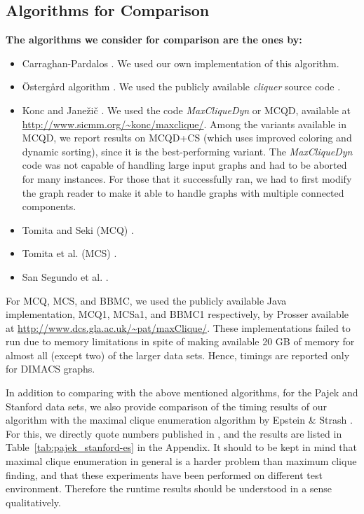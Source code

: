 

\subsection{Algorithms for Comparison}
{\bf The algorithms we consider for comparison are the ones by: 
\begin{itemize}
\item Carraghan-Pardalos \cite{pardalos}. We used our own implementation of this algorithm.
\item \"{O}sterg{\aa}rd algorithm \cite{ostergard}. We used the publicly available {\it cliquer} source code \cite{cliquer}.
\item Konc and Jane\v{z}i\v{c} \cite{konc2007improved}. We used the code {\it MaxCliqueDyn} or MCQD, available at \\{\small \url{http://www.sicmm.org/~konc/maxclique/}}. Among the variants available in MCQD, we report results on MCQD+CS (which uses improved coloring and dynamic sorting), since it is the best-performing variant. The {\it MaxCliqueDyn} code was not capable of handling large input graphs and had to be aborted for many instances. For those that it successfully ran, we had to first modify the graph reader to make it able to handle graphs with multiple connected components.
\item Tomita and Seki (MCQ) \cite{citeulike:7905505}.
\item Tomita et al. (MCS) \cite{walcom}.
\item San Segundo et al. \cite{SanSegundo}.
\end{itemize}
For MCQ, MCS, and BBMC, we used the publicly available Java implementation, MCQ1, MCSa1, and BBMC1 respectively, by Prosser \cite{prosser2012}  available at {\small \url{http://www.dcs.gla.ac.uk/~pat/maxClique/}}. These implementations failed to run due to memory limitations in spite of making available 20 GB of memory for almost all (except two) of the larger data sets. Hence, timings are reported only for DIMACS graphs. 

In addition to comparing with the above mentioned algorithms, for the Pajek and Stanford data sets, we also provide comparison of the timing results of our algorithm with the maximal clique enumeration algorithm by Epstein \& Strash \cite{sea}. For this, we directly quote numbers published in \cite{sea}, and the results are listed in Table~\ref{tab:pajek_stanford-es} in the Appendix.
It should to be kept in mind that maximal clique enumeration in general is a harder problem than maximum clique finding, and that these experiments have been performed on different test environment. Therefore the runtime results should be understood in a sense qualitatively.
}

